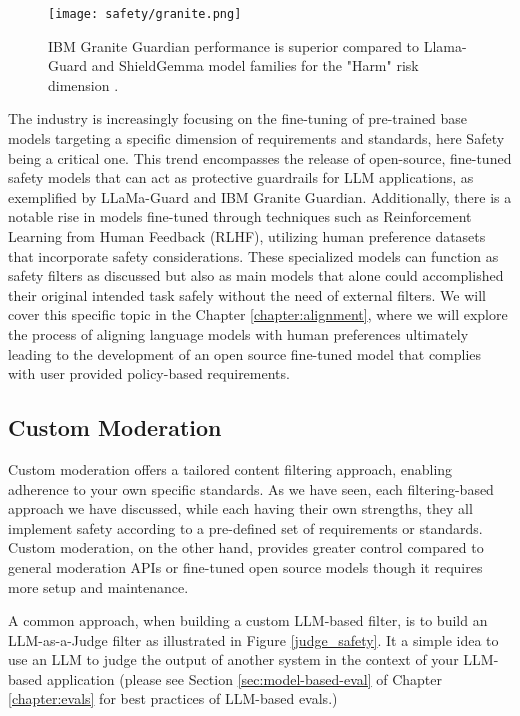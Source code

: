 \begin{figure}[H]
\centering
\texttt{[image: safety/granite.png]}
\caption{IBM Granite Guardian performance is superior compared to Llama-Guard and ShieldGemma model families for the "Harm" risk dimension \cite{padhi2024graniteguardian}.}
\label{granite}
\end{figure}

The industry is increasingly focusing on the fine-tuning of pre-trained base models targeting a specific dimension of requirements and standards, here Safety being a critical one. This trend encompasses the release of open-source, fine-tuned safety models that can act as protective guardrails for LLM applications, as exemplified by LLaMa-Guard and IBM Granite Guardian. Additionally, there is a notable rise in models fine-tuned through techniques such as Reinforcement Learning from Human Feedback (RLHF), utilizing human preference datasets that incorporate safety considerations. These specialized models can function as safety filters as discussed but also as main models that alone could accomplished their original intended task safely without the need of external filters. We will cover this specific topic in the Chapter \ref{chapter:alignment}, where we will explore the process of aligning language models with human preferences ultimately leading to the development of an open source fine-tuned model that complies with user provided policy-based requirements.

\subsection{Custom Moderation}
\label{custom-moderation}

Custom moderation offers a tailored content filtering approach, enabling adherence to your own specific standards. As we have seen, each filtering-based approach we have discussed, while each having their own strengths, they all implement safety according to a pre-defined set of requirements or standards. Custom moderation, on the other hand, provides greater control compared to general moderation APIs or fine-tuned open source models though it requires more setup and maintenance. 

A common approach, when building a custom LLM-based filter, is to build an LLM-as-a-Judge filter as illustrated in Figure \ref{judge_safety}. It a simple idea to use an LLM to judge the output of another system in the context of your LLM-based application (please see Section \ref{sec:model-based-eval} of Chapter \ref{chapter:evals} for best practices of LLM-based evals.)

